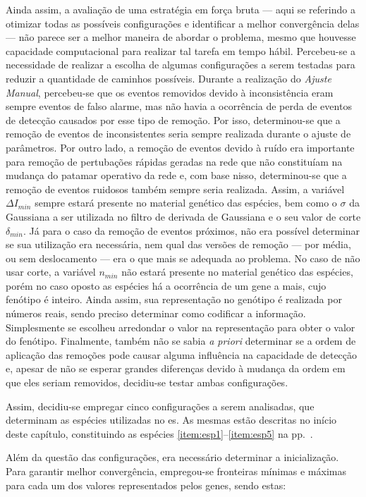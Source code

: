 Ainda assim, a avaliação de uma estratégia em força bruta --- aqui se
referindo a otimizar todas as possíveis configurações e identificar a
melhor convergência delas --- não parece ser a melhor maneira de
abordar o problema, mesmo que houvesse capacidade computacional para
realizar tal tarefa em tempo hábil. Percebeu-se a necessidade de
realizar a escolha de algumas configurações a serem testadas para
reduzir a quantidade de caminhos possíveis.  
Durante a realização do \emph{Ajuste Manual}, percebeu-se que os
eventos removidos devido à inconsistência eram sempre eventos de falso
alarme, mas não havia a ocorrência de perda de eventos de detecção
causados por esse tipo de remoção. Por isso, determinou-se que a
remoção de eventos de inconsistentes seria sempre realizada durante o
ajuste de parâmetros. Por outro lado, a remoção de eventos devido à
ruído era importante para remoção de pertubações rápidas geradas na
rede que não constituíam na mudança do patamar operativo da rede e,
com base nisso, determinou-se que a remoção de eventos ruidosos também
sempre seria realizada. Assim, a variável $\Delta I_{min}$ sempre
estará presente no material genético das espécies, bem como o $\sigma$
da Gaussiana a ser utilizada no filtro de derivada de Gaussiana e o
seu valor de corte $\delta_{min}$. Já para o caso da remoção de
eventos próximos, não era possível determinar se sua utilização era
necessária, nem qual das versões de remoção --- por média, ou sem
deslocamento --- era o que mais se adequada ao problema. No caso de
não usar corte, a variável $n_{min}$ não estará presente no material
genético das espécies, porém no caso oposto as espécies há a
ocorrência de um gene a mais, cujo fenótipo é inteiro. Ainda assim,
sua representação no genótipo é realizada por números reais, sendo
preciso determinar como codificar a informação. Simplesmente se
escolheu arredondar o valor na representação para obter o valor do
fenótipo. Finalmente, também não se sabia \emph{a priori} determinar
se a ordem de aplicação das remoções pode causar alguma influência na
capacidade de detecção e, apesar de não se esperar grandes diferenças
devido à mudança da ordem em que eles seriam removidos, decidiu-se
testar ambas configurações.  

Assim, decidiu-se empregar cinco configurações a serem analisadas, que
determinam as espécies utilizadas no \acs{es}. As mesmas estão
descritas no início deste capítulo, constituindo as espécies
\ref{item:esp1}--\ref{item:esp5} na pp.~\pageref{item:esp1}.

Além da questão das configurações, era necessário determinar a
inicialização. Para garantir melhor convergência, empregou-se
fronteiras mínimas e máximas para cada um dos valores representados
pelos genes, sendo estas:

